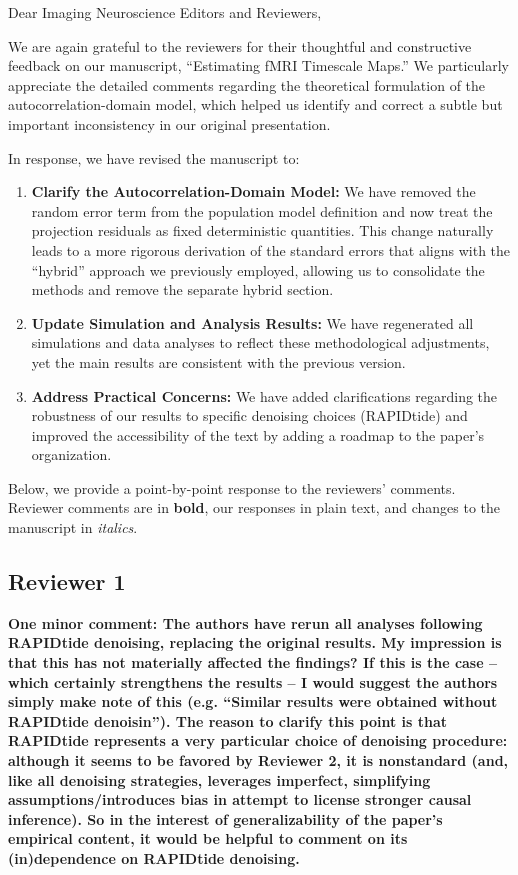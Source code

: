 \documentclass[docs/main.tex]{subfiles}
\newcommand{\reviewercomment}[1]{\vspace{0.3cm}\noindent\textbf{#1}\vspace{0.15cm}}
\begin{document}
Dear Imaging Neuroscience Editors and Reviewers,

We are again grateful to the reviewers for their thoughtful and constructive feedback on our manuscript, ``Estimating fMRI Timescale Maps.'' We particularly appreciate the detailed comments regarding the theoretical formulation of the autocorrelation-domain model, which helped us identify and correct a subtle but important inconsistency in our original presentation.

In response, we have revised the manuscript to:
\begin{enumerate}
    \item \textbf{Clarify the Autocorrelation-Domain Model:} We have removed the random error term from the population model definition and now treat the projection residuals as fixed deterministic quantities. This change naturally leads to a more rigorous derivation of the standard errors that aligns with the ``hybrid'' approach we previously employed, allowing us to consolidate the methods and remove the separate hybrid section.
    \item \textbf{Update Simulation and Analysis Results:} We have regenerated all simulations and data analyses to reflect these methodological adjustments, yet the main results are consistent with the previous version.
    \item \textbf{Address Practical Concerns:} We have added clarifications regarding the robustness of our results to specific denoising choices (RAPIDtide) and improved the accessibility of the text by adding a roadmap to the paper's organization.
\end{enumerate}

\vspace{0.5cm}

Below, we provide a point-by-point response to the reviewers’ comments. Reviewer comments are in \textbf{bold}, our responses in plain text, and changes to the manuscript in \textit{italics}.

\subsection*{Reviewer 1}

\reviewercomment{
One minor comment: The authors have rerun all analyses following RAPIDtide denoising, replacing the original results. My impression is that this has not materially affected the findings? If this is the case -- which certainly strengthens the results -- I would suggest the authors simply make note of this (e.g. ``Similar results were obtained without RAPIDtide denoisin''). The reason to clarify this point is that RAPIDtide represents a very particular choice of denoising procedure: although it seems to be favored by Reviewer 2, it is nonstandard (and, like all denoising strategies, leverages imperfect, simplifying assumptions/introduces bias in attempt to license stronger causal inference). So in the interest of generalizability of the paper's empirical content, it would be helpful to comment on its (in)dependence on RAPIDtide denoising.}
\end{document}
